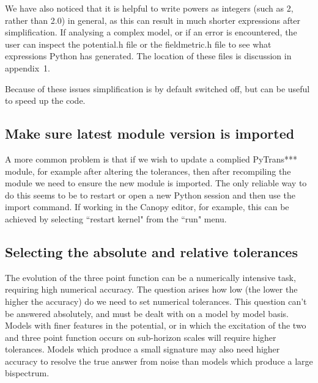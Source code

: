 \documentclass[10pt,
amsmath,amssymb,
aps,prd,nofootinbib,eqsecnum,a4paper]{revtex4}
\begin{document}
We have also noticed that it is helpful to write powers as integers (such as 2, rather than 2.0) in general, as this can result in 
much shorter expressions after simplification. If analysing a complex model, or if an error is encountered, the user can 
inspect the potential.h file or the fieldmetric.h file to see what expressions Python has generated. The location of these files is 
discussion in appendix~1.

Because of these issues simplification is by default switched off, but can be useful to speed up the code.

\subsection{Make sure latest module version is imported}

A more common problem is that if we wish to update a complied PyTrans*** module, for 
example after altering the tolerances, then after recompiling the module we need to 
ensure the new module is imported. The only reliable way to do this seems to be to restart or open 
a new Python session
 and then use the import command. If working in the Canopy editor, for example, this can be achieved by selecting 
 ``restart kernel" from the ``run" menu. 

\subsection{Selecting the absolute and relative tolerances}

The evolution of the three point function  can be a numerically intensive task, requiring high numerical 
accuracy. The question arises how low (the lower the higher the accuracy) do we need to set numerical 
tolerances. This question can't be answered absolutely, and must be dealt with on a model by model basis. Models 
with finer features in the potential, or in which the excitation of the two and three point function 
occurs on sub-horizon scales will require higher tolerances. Models which produce a small signature may also need 
higher accuracy to resolve the true answer from noise than models which produce a large bispectrum. 
\end{document}
